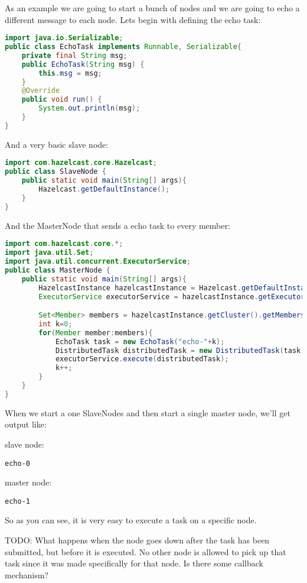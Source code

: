 As an example we are going to start a bunch of nodes and we are going to echo a different message to each node. Lets begin with defining the echo task:

\begin{lstlisting}[language=java]
import java.io.Serializable;
public class EchoTask implements Runnable, Serializable{
    private final String msg;
    public EchoTask(String msg) {
        this.msg = msg;
    }
    @Override
    public void run() {
        System.out.println(msg);
    }
}
\end{lstlisting}

And a very basic slave node:
\begin{lstlisting}[language=java]
import com.hazelcast.core.Hazelcast;
public class SlaveNode {
    public static void main(String[] args){
        Hazelcast.getDefaultInstance();
    }
}
\end{lstlisting}

And the MasterNode that sends a echo task to every member:
\begin{lstlisting}[language=java]
import com.hazelcast.core.*;
import java.util.Set;
import java.util.concurrent.ExecutorService;
public class MasterNode {
    public static void main(String[] args){
        HazelcastInstance hazelcastInstance = Hazelcast.getDefaultInstance();
        ExecutorService executorService = hazelcastInstance.getExecutorService();

        Set<Member> members = hazelcastInstance.getCluster().getMembers();
        int k=0;
        for(Member member:members){
            EchoTask task = new EchoTask("echo-"+k);
            DistributedTask distributedTask = new DistributedTask(task, member);
            executorService.execute(distributedTask);
            k++;
        }
    }
}
\end{lstlisting}

When we start a one SlaveNodes and then start a single master node, we'll get output like:

slave node:
\begin{verbatim}
echo-0
\end{verbatim}

master node:
\begin{verbatim}
echo-1
\end{verbatim}

So as you can see, it is very easy to execute a task on a specific node.

TODO: What happens when the node goes down after the task has been submitted, but before it is executed. No other node is allowed to pick up that task since it was made specifically for that node. Is there some callback mechanism?

